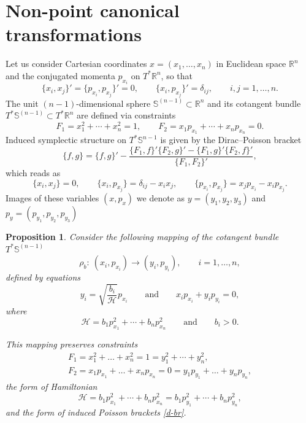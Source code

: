\documentclass[pdftex]{sigma}
\numberwithin{equation}{section}
\newtheorem{Proposition}[Theorem]{Proposition}
 { \theoremstyle{definition}
\newtheorem{Definition}[Theorem]{Definition}
\newtheorem{Note}[Theorem]{Note}
\newtheorem{Example}[Theorem]{Example}
\newtheorem{Remark}[Theorem]{Remark} }
\begin{document}
\section{Non-point canonical transformations}

 Let us consider Cartesian coordinates $x=(x_1,\dots, x_n)$ in Euclidean space $\mathbb R^{n}$ and the conjugated momenta $p_{x_i}$ on $T^*\mathbb R^{n}$, so that
\[
\{x_i,x_j\}'=\{p_{x_i},p_{x_j}\}'=0 ,\qquad \{x_i,p_{x_j}\}'=\delta_{ij} ,\qquad i,j=1,\dots,n.
\]
The unit $(n-1)$-dimensional sphere $\mathbb S^{(n-1)}\subset \mathbb R^n$ and its cotangent bundle $T^*\mathbb S^{(n-1)}\subset T^*\mathbb R^n$ are defined via constraints
\begin{equation} \label{f-con}
F_1=x_1^2+\cdots+x_n^2=1 , \qquad
F_2=x_1p_{x_1}+\cdots+x_np_{x_n}=0 .
\end{equation}
Induced symplectic structure on $T^*\mathbb S^{n-1}$ is given by the Dirac--Poisson bracket
\[
\{f,g\}=\{f,g\}'-\dfrac{\{F_1,f\}'\{F_2,g\}'-\{F_1,g\}'\{F_2,f\}'}{\{F_1,F_2\}'},
\]
which reads as
\begin{equation}\label{d-br}
\{x_i,x_j\}=0 ,\qquad \{x_i,p_{x_j}\}=\delta_{ij}-x_ix_j ,\qquad \{p_{x_i},p_{x_j}\}=x_jp_{x_i}-x_ip_{x_j} .
\end{equation}
Images of these variables $(x,p_x)$ we denote as $y=(y_1,y_2,y_3)$ and $p_y=(p_{y_1},p_{y_2},p_{y_3})$
\begin{Proposition}
Consider the following mapping of the cotangent bundle $T^*\mathbb S^{(n-1)}$
\[
\rho_b\colon \ (x_i,p_{x_i})\to (y_i,p_{y_i}) ,\qquad i=1,\dots,n,\]
defined by equations
\begin{equation}\label{g-trans2}
y_i= \sqrt{\frac{b_i}{\mathcal H}} p_{x_i}\qquad\text{and}\qquad x_ip_{x_i}+y_ip_{y_i}=0 ,
\end{equation}
where
\[\mathcal H=b_1p_{x_1}^2+\cdots +b_n p_{x_n}^2\qquad\text{and}  \qquad b_i>0 .\]

This mapping preserves constraints
\begin{gather*}
F_1=x_1^2+\dots+x_n^2=1=y_1^2+\cdots+y_n^2 ,\\
F_2=x_1p_{x_1}+\dots+x_np_{x_n}=0=y_1p_{y_1}+\dots+y_np_{y_n} ,
\end{gather*}
the form of Hamiltonian
\begin{equation}\label{g-ham}
\mathcal H=b_1p_{x_1}^2+\cdots +b_n p_{x_n}^2=b_1 p_{y_1}^2+\cdots+b_n p_{y_n}^2 ,
\end{equation}
and the form of induced Poisson brackets \eqref{d-br}.
\end{Proposition}
\end{document}
